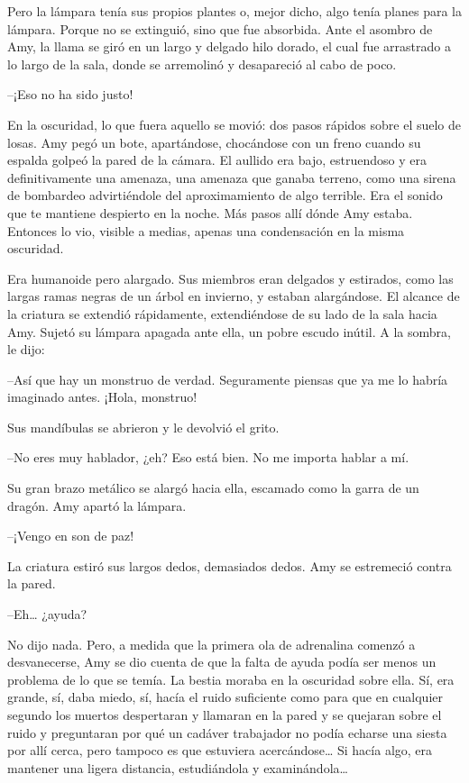 {Pero la lámpara tenía sus propios plantes o, mejor dicho, algo tenía
	planes para la lámpara. Porque no se extinguió, sino que fue absorbida.
	Ante el asombro de Amy, la llama se giró en un largo y delgado hilo
	dorado, el cual fue arrastrado a lo largo de la sala, donde se
arremolinó y desapareció al cabo de poco.}

{--¡Eso no ha sido justo!}

{En la oscuridad, lo que fuera aquello se movió: dos pasos rápidos sobre
	el suelo de losas. Amy pegó un bote, apartándose, chocándose con un
	freno cuando su espalda golpeó la pared de la cámara. El aullido era
	bajo, estruendoso y era definitivamente una amenaza, una amenaza que
	ganaba terreno, como una sirena de bombardeo advirtiéndole del
	aproximamiento de algo terrible. Era el sonido que te mantiene despierto
	en la noche. Más pasos allí dónde Amy estaba. Entonces lo vio, visible a
medias, apenas una condensación en la misma oscuridad.}

{Era humanoide pero alargado. Sus miembros eran delgados y estirados,
	como las largas ramas negras de un árbol en invierno, y estaban
	alargándose. El alcance de la criatura se extendió rápidamente,
	extendiéndose de su lado de la sala hacia Amy. Sujetó su lámpara apagada
ante ella, un pobre escudo inútil. A la sombra, le dijo:}

{--Así que hay un monstruo de verdad. Seguramente piensas que ya me lo
habría imaginado antes. ¡Hola, monstruo!}

{Sus mandíbulas se abrieron y le devolvió el grito.}

{--No eres muy hablador, ¿eh? Eso está bien. No me importa hablar a
mí.}

{Su gran brazo metálico se alargó hacia ella, escamado como la garra de
un dragón. Amy apartó la lámpara.}

{--¡Vengo en son de paz!}

{La criatura estiró sus largos dedos, demasiados dedos. Amy se
estremeció contra la pared.}

{--Eh\ldots{} ¿ayuda?}

{No dijo nada. Pero, a medida que la primera ola de adrenalina comenzó a
	desvanecerse, Amy se dio cuenta de que la falta de ayuda podía ser menos
	un problema de lo que se temía. La bestia moraba en la oscuridad sobre
	ella. Sí, era grande, sí, daba miedo, sí, hacía el ruido suficiente como
	para que en cualquier segundo los muertos despertaran y llamaran en la
	pared y se quejaran sobre el ruido y preguntaran por qué un cadáver
	trabajador no podía echarse una siesta por allí cerca, pero tampoco es
	que estuviera acercándose\ldots{} Si hacía algo, era mantener una ligera
	distancia, estudiándola y examinándola\ldots{}}

